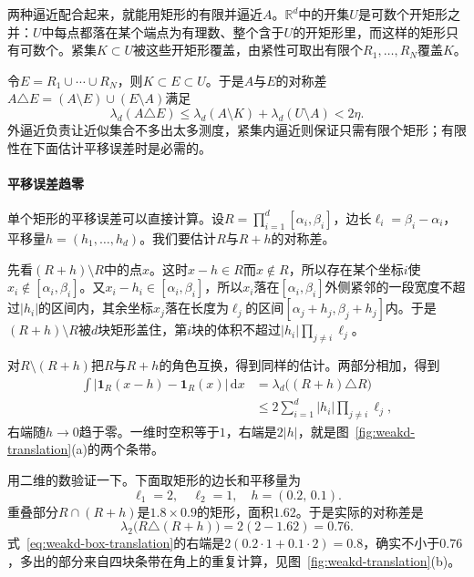 两种逼近配合起来，就能用矩形的有限并逼近$A$。$\mathbb R^d$中的开集$U$是可数个开矩形之并：$U$中每点都落在某个端点为有理数、整个含于$U$的开矩形里，而这样的矩形只有可数个。紧集$K\subset U$被这些开矩形覆盖，由紧性可取出有限个$R_1,\ldots,R_N$覆盖$K$。

令$E=R_1\cup\cdots\cup R_N$，则$K\subset E\subset U$。于是$A$与$E$的对称差$A\triangle E=(A\setminus E)\cup(E\setminus A)$满足
\begin{equation}
\lambda_d(A\triangle E)\leq\lambda_d(A\setminus K)+\lambda_d(U\setminus A)<2\eta .
\label{eq:weakd-box-approx}
\end{equation}
外逼近负责让近似集合不多出太多测度，紧集内逼近则保证只需有限个矩形；有限性在下面估计平移误差时是必需的。

\paragraph{平移误差趋零}
单个矩形的平移误差可以直接计算。设$R=\prod_{i=1}^d[\alpha_i,\beta_i]$，边长$\ell_i=\beta_i-\alpha_i$，平移量$h=(h_1,\ldots,h_d)$。我们要估计$R$与$R+h$的对称差。

先看$(R+h)\setminus R$中的点$x$。这时$x-h\in R$而$x\notin R$，所以存在某个坐标$i$使$x_i\notin[\alpha_i,\beta_i]$。又$x_i-h_i\in[\alpha_i,\beta_i]$，所以$x_i$落在$[\alpha_i,\beta_i]$外侧紧邻的一段宽度不超过$\lvert h_i\rvert$的区间内，其余坐标$x_j$落在长度为$\ell_j$的区间$[\alpha_j+h_j,\beta_j+h_j]$内。于是$(R+h)\setminus R$被$d$块矩形盖住，第$i$块的体积不超过$\lvert h_i\rvert\prod_{j\neq i}\ell_j$。

对$R\setminus(R+h)$把$R$与$R+h$的角色互换，得到同样的估计。两部分相加，得到
\begin{equation}
\begin{aligned}
\int\lvert\mathbf 1_R(x-h)-\mathbf 1_R(x)\rvert\,\mathrm dx&=\lambda_d\bigl((R+h)\triangle R\bigr)\\
&\leq2\sum_{i=1}^d\lvert h_i\rvert\prod_{j\neq i}\ell_j ,
\end{aligned}
\label{eq:weakd-box-translation}
\end{equation}
右端随$h\to0$趋于零。一维时空积等于$1$，右端是$2\lvert h\rvert$，就是图~\ref{fig:weakd-translation}(a)的两个条带。

用二维的数验证一下。下面取矩形的边长和平移量为
\[
\ell_1=2,\quad\ell_2=1,\quad h=(0.2,\,0.1).
\]
重叠部分$R\cap(R+h)$是$1.8\times0.9$的矩形，面积$1.62$。于是实际的对称差是
\[
\lambda_2\bigl(R\triangle(R+h)\bigr)=2(2-1.62)=0.76 .
\]
式~\eqref{eq:weakd-box-translation}的右端是$2(0.2\cdot1+0.1\cdot2)=0.8$，确实不小于$0.76$，多出的部分来自四块条带在角上的重复计算，见图~\ref{fig:weakd-translation}(b)。

